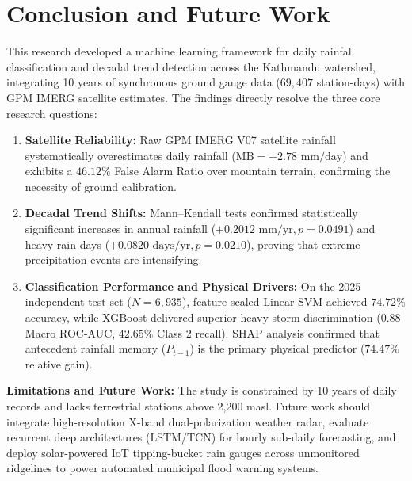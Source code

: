 \documentclass[conference]{IEEEtran}
\begin{document}
\section{Conclusion and Future Work}
\label{sec:conclusion}
This research developed a machine learning framework for daily rainfall classification and decadal trend detection across the Kathmandu watershed, integrating 10 years of synchronous ground gauge data ($69{,}407$ station-days) with GPM IMERG satellite estimates. The findings directly resolve the three core research questions:
\begin{enumerate}
    \item \textbf{Satellite Reliability:} Raw GPM IMERG V07 satellite rainfall systematically overestimates daily rainfall ($\text{MB} = +2.78\text{ mm/day}$) and exhibits a $46.12\%$ False Alarm Ratio over mountain terrain, confirming the necessity of ground calibration.
    \item \textbf{Decadal Trend Shifts:} Mann--Kendall tests confirmed statistically significant increases in annual rainfall ($+0.2012\text{ mm/yr}, p = 0.0491$) and heavy rain days ($+0.0820\text{ days/yr}, p = 0.0210$), proving that extreme precipitation events are intensifying.
    \item \textbf{Classification Performance and Physical Drivers:} On the 2025 independent test set ($N = 6{,}935$), feature-scaled Linear SVM achieved $74.72\%$ accuracy, while XGBoost delivered superior heavy storm discrimination ($0.88$ Macro ROC-AUC, $42.65\%$ Class 2 recall). SHAP analysis confirmed that antecedent rainfall memory ($P_{t-1}$) is the primary physical predictor ($74.47\%$ relative gain).
\end{enumerate}

\textbf{Limitations and Future Work:} The study is constrained by 10 years of daily records and lacks terrestrial stations above 2,200 masl. Future work should integrate high-resolution X-band dual-polarization weather radar, evaluate recurrent deep architectures (LSTM/TCN) for hourly sub-daily forecasting, and deploy solar-powered IoT tipping-bucket rain gauges across unmonitored ridgelines to power automated municipal flood warning systems.
\end{document}
